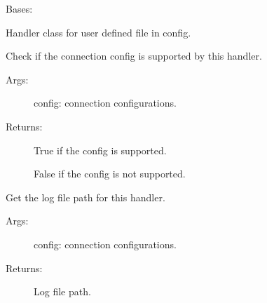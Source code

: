 \documentclass[letterpaper,10pt,english]{sphinxmanual}
\begin{document}

\begin{fulllineitems}
\label{\detokenize{QConnectBase:QConnectBase.qlogger.QFileHandler}}
\sphinxAtStartPar
Bases: 

\sphinxAtStartPar
Handler class for user defined file in config.

\begin{fulllineitems}
\label{\detokenize{QConnectBase:QConnectBase.qlogger.QFileHandler.get_config_supported}}
\sphinxAtStartPar
Check if the connection config is supported by this handler.
\begin{description}
\item[{Args:}] \leavevmode
\sphinxAtStartPar
config: connection configurations.

\item[{Returns:}] \leavevmode
\sphinxAtStartPar
True if the config is supported.

\sphinxAtStartPar
False if the config is not supported.

\end{description}

\end{fulllineitems}


\begin{fulllineitems}
\label{\detokenize{QConnectBase:QConnectBase.qlogger.QFileHandler.get_log_path}}
\sphinxAtStartPar
Get the log file path for this handler.
\begin{description}
\item[{Args:}] \leavevmode
\sphinxAtStartPar
config: connection configurations.

\item[{Returns:}] \leavevmode
\sphinxAtStartPar
Log file path.

\end{description}

\end{fulllineitems}


\end{fulllineitems}
\end{document}
